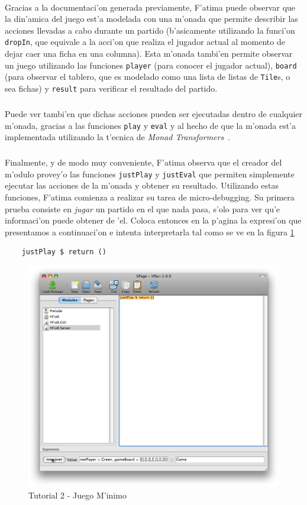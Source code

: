 \documentclass[a4paper]{article}
\begin{document}
\paragraph{}Gracias a la documentaci'on generada previamente, F'atima puede observar que la din'amica del juego est'a modelada con una m'onada que permite describir las acciones llevadas a cabo durante un partido (b'asicamente utilizando la funci'on \texttt{dropIn}, que equivale a la acci'on que realiza el jugador actual al momento de dejar caer una ficha en una columna).  Esta m'onada tambi'en permite observar un juego utilizando las funciones \texttt{player} (para conocer el jugador actual), \texttt{board} (para observar el tablero, que es modelado como una lista de listas de \texttt{Tile}s, o sea fichas) y \texttt{result} para verificar el resultado del partido.
\subparagraph{}Puede ver tambi'en que dichas acciones pueden ser ejecutadas dentro de cualquier m'onada, gracias a las funciones \texttt{play} y \texttt{eval} y al hecho de que la m'onada est'a implementada utilizando la t'ecnica de \textsl{Monad Transformers}~\cite{realworldhaskell}.
\subparagraph{}Finalmente, y de modo muy conveniente, F'atima observa que el creador del m'odulo provey'o las funciones \texttt{justPlay} y \texttt{justEval} que permiten simplemente ejecutar las acciones de la m'onada y obtener su resultado.  Utilizando estas funciones, F'atima comienza a realizar su tarea de micro-debugging.  Su primera prueba consiste en \textit{jugar} un partido en el que nada pasa, s'olo para ver qu'e informaci'on puede obtener de 'el.  Coloca entonces en la p'agina la expresi'on que presentamos a continuaci'on e intenta interpretarla tal como se ve en la figura \ref{tut205}
\lstset{language=haskell, frame=single, tabsize=4}
\begin{center}\begin{lstlisting}
	justPlay $ return ()
\end{lstlisting}\end{center}
\begin{figure}[hp]
	\begin{center}
        	\includegraphics[width=.75\textwidth]{pictures/tut2/05}
		\caption{Tutorial 2 - Juego M'inimo}
		\label{tut205}
	\end{center}
\end{figure}
\end{document}
